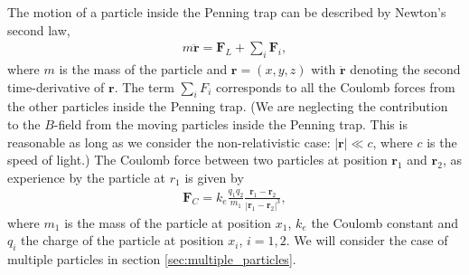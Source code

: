 \documentclass[english,notitlepage,reprint]{revtex4-2}  %
\renewcommand{\vec}[1]{\mathbf{#1}}
\begin{document}
The motion of a particle inside the Penning trap can be described by Newton's second law,
\begin{align}
    m\ddot{\vec{r}} = \vec{F}_{L} + \sum_i \vec{F}_i, \label{eq:motion_Newton}
\end{align}
where \(m\) is the mass of the particle and \(\vec{r}=(x,y,z)\) with \(\ddot{\vec{r}}\) denoting the second time-derivative of \(\vec{r}\). The term \(\sum_i F_i\) corresponds to all the Coulomb forces from the other particles inside the Penning trap. (We are neglecting the contribution to the \(B\)-field from the moving particles inside the Penning trap. This is reasonable as long as we consider the non-relativistic case: \(|\vec{r}|\ll c\), where \(c\) is the speed of light.) The Coulomb force between two particles at position \(\vec{r}_1\) and \(\vec{r}_2\), as experience by the particle at \(r_1\) is given by 
\begin{align}
    \vec{F}_{C} = k_e \frac{q_1q_2}{m_1} \frac{\vec{r}_1 - \vec{r}_2}{|\vec{r}_1 - \vec{r}_2|^3},
\end{align}
where \(m_1\) is the mass of the particle at position \(x_1\), \(k_e\) the Coulomb constant and \(q_{i}\) the charge of the particle at position \(x_i\), \(i=1,2\). We will consider the case of multiple particles in section \ref{sec:multiple_particles}.
\end{document}
